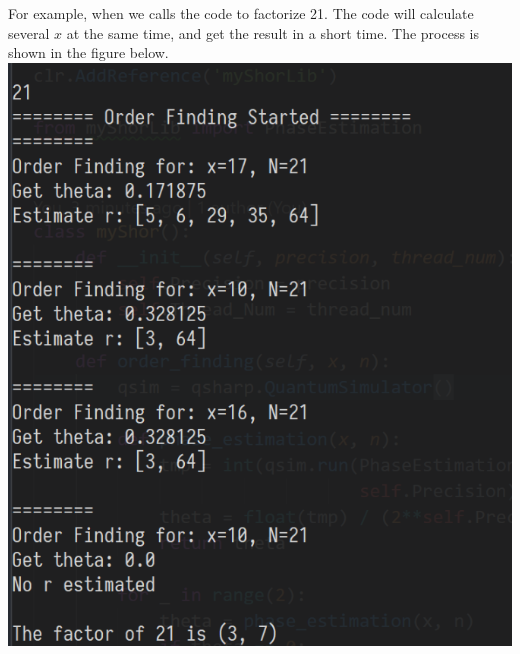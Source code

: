 \documentclass[11pt]{article}
\makeatletter
\def\maxwidth{\ifdim\Gin@nat@width>\linewidth\linewidth
    \else\Gin@nat@width\fi}
\let\Oldincludegraphics\includegraphics
\renewcommand{\includegraphics}[1]{\Oldincludegraphics[width=.8\maxwidth]{#1}}
\makeatother
\begin{document}
    For example, when we calls the code to factorize 21. The code will
calculate several \(x\) at the same time, and get the result in a short
time. The process is shown in the figure below.
\includegraphics{./others/parallel.png}


    
    
    
    
\end{document}
